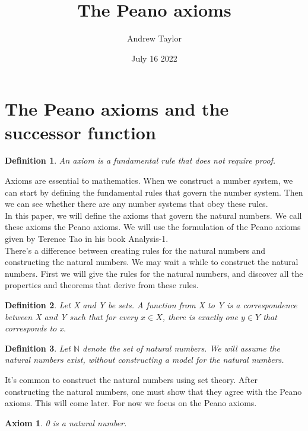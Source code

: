 \documentclass{article}
\title{The Peano axioms}
\author{Andrew Taylor}
\date{July 16 2022}
\newtheorem{axiom}{Axiom}
\newtheorem{definition}{Definition}
\begin{document}
\maketitle

\section{The Peano axioms and the successor function}

\begin{definition}
An axiom is a fundamental rule that does not require proof.
\end{definition}

Axioms are essential to mathematics. When we construct a number system, we can start by defining the fundamental rules that govern the number system. Then we can see whether there are any number systems that obey these rules. \\

In this paper, we will define the axioms that govern the natural numbers. We call these axioms the Peano axioms. We will use the formulation of the Peano axioms given by Terence Tao in his book Analysis-1. \\

There's a difference between creating rules for the natural numbers and constructing the natural numbers. We may wait a while to construct the natural numbers. First we will give the rules for the natural numbers, and discover all the properties and theorems that derive from these rules.

\begin{definition}
Let X and Y be sets. A function from X to Y is a correspondence between X and Y such that for every $x \in X$, there is exactly one $y \in Y$ that corresponds to x. 
\end{definition}

\begin{definition}
Let $\mathbb{N}$ denote the set of natural numbers. We will assume the natural numbers exist, without constructing a model for the natural numbers.
\end{definition}

It's common to construct the natural numbers using set theory. After constructing the natural numbers, one must show that they agree with the Peano axioms. This will come later. For now we focus on the Peano axioms.

\begin{axiom}
0 is a natural number.
\end{axiom}
\end{document}
